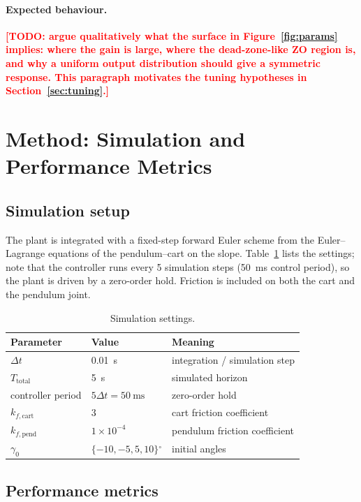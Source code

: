 \documentclass[11pt,a4paper]{article}
\newcommand{\todo}[1]{\textcolor{red}{\textbf{[TODO: #1]}}}
\newcommand{\degC}{\ensuremath{^\circ}}
\newcommand{\gam}{\ensuremath{\gamma}}
\begin{document}
\paragraph{Expected behaviour.}
\todo{argue qualitatively what the surface in Figure~\ref{fig:params} implies:
where the gain is large, where the dead-zone-like ZO region is, and why a
uniform output distribution should give a symmetric response. This paragraph
motivates the tuning hypotheses in Section~\ref{sec:tuning}.}

\section{Method: Simulation and Performance Metrics}
\label{sec:method}

\subsection{Simulation setup}
\label{sec:sim}

The plant is integrated with a fixed-step forward Euler scheme from the
Euler--Lagrange equations of the pendulum--cart on the slope. Table~\ref{tab:sim}
lists the settings; note that the controller runs every 5 simulation steps
(\SI{50}{\ms} control period), so the plant is driven by a zero-order hold.
Friction is included on both the cart and the pendulum joint.

\begin{table}[H]
\centering
\small
\begin{tabular}{@{}lll@{}}
\toprule
\textbf{Parameter} & \textbf{Value} & \textbf{Meaning} \\
\midrule
$\Delta t$          & \SI{0.01}{\s}  & integration / simulation step \\
$T_{\text{total}}$  & \SI{5}{\s}     & simulated horizon \\
controller period   & $5\Delta t = \SI{50}{\ms}$ & zero-order hold \\
$k_{f,\text{cart}}$ & 3              & cart friction coefficient \\
$k_{f,\text{pend}}$ & $1\times10^{-4}$ & pendulum friction coefficient \\
$\gam_0$            & $\{-10,-5,5,10\}\degC$ & initial angles \\
\bottomrule
\end{tabular}
\caption{Simulation settings.}
\label{tab:sim}
\end{table}

\subsection{Performance metrics}
\label{sec:metrics}
\end{document}
